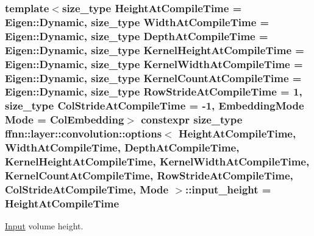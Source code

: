 \hypertarget{structffnn_1_1layer_1_1convolution_1_1options_aabb3c99df1150983902ebf9741a22a1a}{
\subsubsection[{input\-\_\-height}]{\setlength{\rightskip}{0pt plus 5cm}template$<$size\-\_\-type Height\-At\-Compile\-Time = Eigen\-::\-Dynamic, size\-\_\-type Width\-At\-Compile\-Time = Eigen\-::\-Dynamic, size\-\_\-type Depth\-At\-Compile\-Time = Eigen\-::\-Dynamic, size\-\_\-type Kernel\-Height\-At\-Compile\-Time = Eigen\-::\-Dynamic, size\-\_\-type Kernel\-Width\-At\-Compile\-Time = Eigen\-::\-Dynamic, size\-\_\-type Kernel\-Count\-At\-Compile\-Time = Eigen\-::\-Dynamic, size\-\_\-type Row\-Stride\-At\-Compile\-Time = 1, size\-\_\-type Col\-Stride\-At\-Compile\-Time = -\/1, Embedding\-Mode Mode = Col\-Embedding$>$ constexpr {\bf size\-\_\-type} {\bf ffnn\-::layer\-::convolution\-::options}$<$ Height\-At\-Compile\-Time, Width\-At\-Compile\-Time, Depth\-At\-Compile\-Time, Kernel\-Height\-At\-Compile\-Time, Kernel\-Width\-At\-Compile\-Time, Kernel\-Count\-At\-Compile\-Time, Row\-Stride\-At\-Compile\-Time, Col\-Stride\-At\-Compile\-Time, Mode $>$\-::input\-\_\-height = Height\-At\-Compile\-Time\hspace{0.3cm}{\ttfamily [static]}}}\label{structffnn_1_1layer_1_1convolution_1_1options_aabb3c99df1150983902ebf9741a22a1a}


\hyperlink{classffnn_1_1layer_1_1_input}{Input} volume height. 

